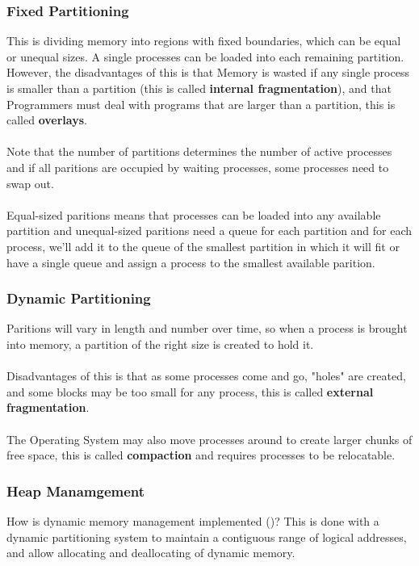 \documentclass{article}
\begin{document}
\subsubsection{Fixed Partitioning}

This is dividing memory into regions with fixed boundaries, which can be equal or unequal sizes. A single processes can be loaded into each remaining partition. However, the disadvantages of this is that Memory is wasted if any single process is smaller than a partition (this is called \textbf{internal fragmentation}), and that Programmers must deal with programs that are larger than a partition, this is called \textbf{overlays}.
\\
\\
Note that the number of partitions determines the number of active processes and if all paritions are occupied by waiting processes, some processes need to swap out.\\
\\
Equal-sized paritions means that processes can be loaded into any available partition and unequal-sized paritions need a queue for each partition and for each process, we'll add it to the queue of the smallest partition in which it will fit or have a single queue and assign a process to the smallest available parition.

\subsubsection{Dynamic Partitioning}

Paritions will vary in length and number over time, so when a process is brought into memory, a partition of the right size is created to hold it.
\\
\\
Disadvantages of this is that as some processes come and go, "holes" are created, and some blocks may be too small for any process, this is called \textbf{external fragmentation}.\\
\\
The Operating System may also move processes around to create larger chunks of free space, this is called \textbf{compaction} and requires processes to be relocatable.

\subsubsection{Heap Manamgement}

How is dynamic memory management implemented ()? This is done with a dynamic partitioning system to maintain a contiguous range of logical addresses, and allow allocating and deallocating of dynamic memory.
\end{document}
